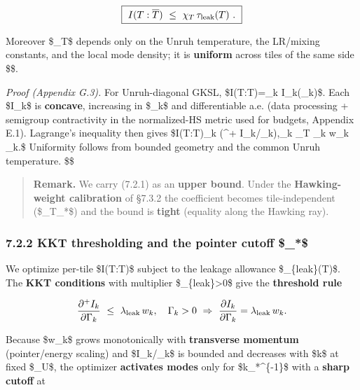 \documentclass[
]{article}
\numberwithin{equation}{section}
\begin{document}
\[
\boxed{\ I(T:\overline T)\ \le\ \chi_T\,\tau_{\rm leak}(T)\ .\ }
\]

Moreover \$\chi\_T\$ depends only on the Unruh temperature, the
LR/mixing constants, and the local mode density; it is \textbf{uniform}
across tiles of the same side \$\ell\$.

\emph{Proof (Appendix G.3).} For Unruh-diagonal GKSL,
\$I(T:\overline T)=\sum\_k I\_k(\Gamma\_k)\$. Each \$I\_k\$ is
\textbf{concave}, increasing in \$\Gamma\_k\$ and differentiable a.e.
(data processing + semigroup contractivity in the normalized-HS metric
used for budgets, Appendix E.1). Lagrange's inequality then gives
\$I(T:\overline T)\le \sum\_k (\partial\^{}+
I\_k/\partial\Gamma\_k),\Gamma\_k \le \chi\_T \sum\_k w\_k \Gamma\_k.\$
Uniformity follows from bounded geometry and the common Unruh
temperature. \$\square\$

\begin{quote}
\textbf{Remark.} We carry (7.2.1) as an \textbf{upper bound}. Under the
\textbf{Hawking-weight calibration} of §7.3.2 the coefficient becomes
tile-independent (\$\chi\_T\equiv\chi\_*\$) and the bound is
\textbf{tight} (equality along the Hawking ray).
\end{quote}

\hypertarget{kkt-thresholding-and-the-pointer-cutoff-_}{%
\subsubsection{\texorpdfstring{7.2.2 KKT thresholding and the pointer
cutoff
\$\ell\_*\$}{7.2.2 KKT thresholding and the pointer cutoff \$\_*\$}}\label{kkt-thresholding-and-the-pointer-cutoff-_}}

We optimize per-tile \$I(T:\overline T)\$ subject to the leakage
allowance \$\tau\_\{\rm leak\}(T)\$. The \textbf{KKT conditions} with
multiplier \$\lambda\_\{\rm leak\}\textgreater0\$ give the
\textbf{threshold rule}

\[
\frac{\partial^+ I_k}{\partial \Gamma_k}\ \le\ \lambda_{\rm leak}\,w_k,\quad
\Gamma_k>0\ \Rightarrow\ \frac{\partial I_k}{\partial \Gamma_k}=\lambda_{\rm leak}\,w_k.
\]

Because \$w\_k\$ grows monotonically with \textbf{transverse momentum}
(pointer/energy scaling) and \$\partial I\_k/\partial\Gamma\_k\$ is
bounded and decreases with \$\textbar k\textbar\$ at fixed \$\beta\_U\$,
the optimizer \textbf{activates modes} only for
\$\textbar k\textbar{}\lesssim \ell\_*\^{}\{-1\}\$ with a \textbf{sharp
cutoff} at
\end{document}
